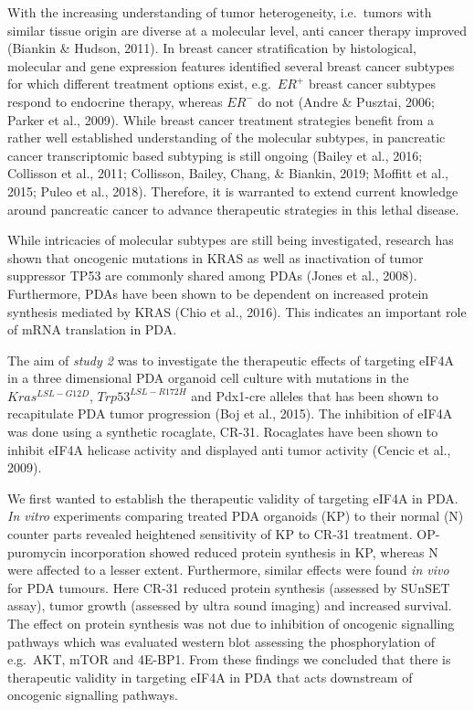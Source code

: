 \documentclass[
  12pt,
  openany]{book}
\begin{document}
With the increasing understanding of tumor heterogeneity, i.e.~tumors with similar tissue origin are diverse at a molecular level, anti cancer therapy improved (Biankin \& Hudson, 2011). In breast cancer stratification by histological, molecular and gene expression features identified several breast cancer subtypes for which different treatment options exist, e.g.~\(ER^+\) breast cancer subtypes respond to endocrine therapy, whereas \(ER^-\) do not (Andre \& Pusztai, 2006; Parker et al., 2009). While breast cancer treatment strategies benefit from a rather well established understanding of the molecular subtypes, in pancreatic cancer transcriptomic based subtyping is still ongoing (Bailey et al., 2016; Collisson et al., 2011; Collisson, Bailey, Chang, \& Biankin, 2019; Moffitt et al., 2015; Puleo et al., 2018). Therefore, it is warranted to extend current knowledge around pancreatic cancer to advance therapeutic strategies in this lethal disease.

While intricacies of molecular subtypes are still being investigated, research has shown that oncogenic mutations in KRAS as well as inactivation of tumor suppressor TP53 are commonly shared among PDAs (Jones et al., 2008). Furthermore, PDAs have been shown to be dependent on increased protein synthesis mediated by KRAS (Chio et al., 2016). This indicates an important role of mRNA translation in PDA.

The aim of \emph{study 2} was to investigate the therapeutic effects of targeting eIF4A in a three dimensional PDA organoid cell culture with mutations in the \(Kras^{LSL-G12D}\), \(Trp53^{LSL-R172H}\) and Pdx1-cre alleles that has been shown to recapitulate PDA tumor progression (Boj et al., 2015). The inhibition of eIF4A was done using a synthetic rocaglate, CR-31. Rocaglates have been shown to inhibit eIF4A helicase activity and displayed anti tumor activity (Cencic et al., 2009).

We first wanted to establish the therapeutic validity of targeting eIF4A in PDA. \emph{In vitro} experiments comparing treated PDA organoids (KP) to their normal (N) counter parts revealed heightened sensitivity of KP to CR-31 treatment. OP-puromycin incorporation showed reduced protein synthesis in KP, whereas N were affected to a lesser extent. Furthermore, similar effects were found \emph{in vivo} for PDA tumours. Here CR-31 reduced protein synthesis (assessed by SUnSET assay), tumor growth (assessed by ultra sound imaging) and increased survival. The effect on protein synthesis was not due to inhibition of oncogenic signalling pathways which was evaluated western blot assessing the phosphorylation of e.g.~AKT, mTOR and 4E-BP1. From these findings we concluded that there is therapeutic validity in targeting eIF4A in PDA that acts downstream of oncogenic signalling pathways.
\end{document}
